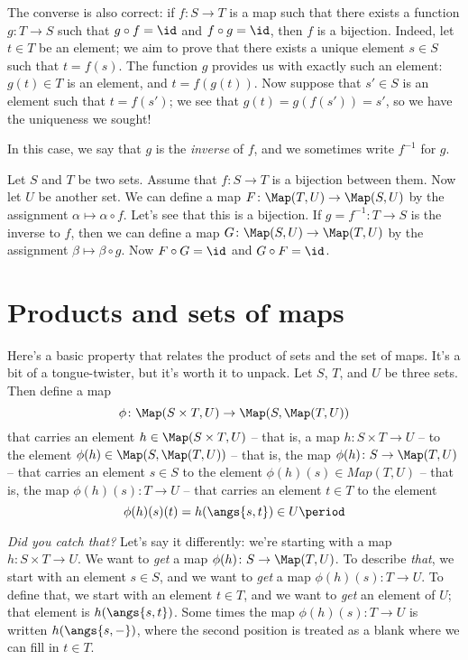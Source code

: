 The converse is also correct: if $f \colon S \to T$ is a map such that there exists a function $g \colon T \to S $ such that $g \circ f =\id $ and $f \circ g = \id$, then $f$ is a bijection.
Indeed, let $t \in T$ be an element;
we aim to prove that there exists a unique element $ s \in S$ such that $t = f(s)$.
The function $g$ provides us with exactly such an element: $g(t) \in T$ is an element, and $t = f(g(t))$.
Now suppose that $s'\in S$ is an element such that $t = f(s')$;
we see that $g(t) = g(f(s')) = s'$, so we have the uniqueness we sought!

In this case, we say that $g$ is the \emph{inverse} of $f$, and we sometimes write $f^{-1}$ for $g$.

\begin{exm}
	Let $S$ and $T$ be two sets.
	Assume that $ f \colon S \to T $ is a bijection between them.
	Now let $U$ be another set.
	We can define a map $F \colon \Map(T, U) \to \Map(S, U)$ by the assignment $ \alpha \mapsto \alpha \circ f$.
	Let's see that this is a bijection.
	If $g = f^{-1} \colon T \to S $ is the inverse to $f$, then we can define a map $G \colon \Map(S, U) \to \Map(T, U)$ by the assignment $ \beta \mapsto \beta \circ g$.
	Now $F \circ G = \id$ and $G \circ F = \id$.
\end{exm}

\section{Products and sets of maps}%
\label{sec:products_and_sets_of_maps}

Here's a basic property that relates the product of sets and the set of maps.
It's a bit of a tongue-twister, but it's worth it to unpack.
Let $S$, $T$, and $U$ be three sets.
Then define a map
\[
	\phi \colon \Map(S \times T, U) \to \Map(S, \Map(T, U))
\]
that carries an element $h \in \Map(S \times T, U) $ -- that is, a map $ h \colon S \times T \to U $ -- to the element $\phi(h) \in \Map(S, \Map(T, U))$ -- that is, the map $\phi(h) \colon S \to \Map(T, U)$ -- that carries an element $ s \in S $ to the element $\phi(h)(s) \in Map(T,U) $ -- that is, the map $\phi(h)(s) \colon T \to U $ -- that carries an element $t \in T $ to the element
\[
	\phi(h)(s)(t) = h(\angs{s,t}) \in U \period
\]

\emph{Did you catch that?}
Let's say it differently: we're starting with a map $h \colon S \times T \to U $.
We want to \emph{get} a map $\phi(h) \colon S \to \Map(T,U) $.
To describe \emph{that}, we start with an element $s \in S$, and we want to \emph{get} a map $\phi(h)(s) \colon T \to U$.
To define that, we start with an element $t \in T$, and we want to \emph{get} an element of $U$;
that element is $h(\angs{s,t})$.
Some times the map $\phi(h)(s) \colon T \to U $ is written $h(\angs{s,-})$, where the second position is treated as a blank where we can fill in $ t \in T$.

